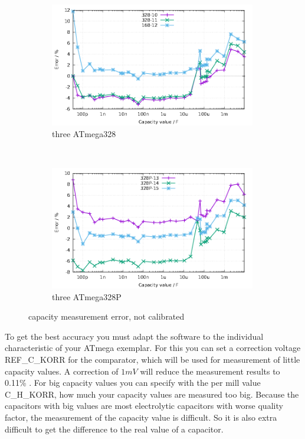 \begin{figure}[H]
  \begin{subfigure}[b]{9cm}
    \centering
    \includegraphics[width=9cm]{../GNU/Mega328all.pdf}
    \caption{three ATmega328}
    \label{fig:mega328all}
  \end{subfigure}
  ~
  \begin{subfigure}[b]{9cm}
    \centering
    \includegraphics[width=9cm]{../GNU/Mega328Pall.pdf}
    \caption{three ATmega328P}
    \label{fig:mega328Pall}
  \end{subfigure}
\caption{capacity measurement error, not calibrated}
\end{figure}

To get the best accuracy you must adapt the software to the individual characteristic of your ATmega exemplar.
For this you can set a correction voltage REF\_C\_KORR for the comparator, which will be used for measurement of little capacity values.
A correction of \(1mV\) will reduce the measurement results to 0.11\% .
For big capacity values you can specify with the per mill value C\_H\_KORR, how much your capacity values are measured too big.
Because the capacitors with big values are most electrolytic capacitors with worse quality factor, the measurement of
the capacity value is difficult. So it is also extra difficult to get the difference to the real value of a capacitor.

